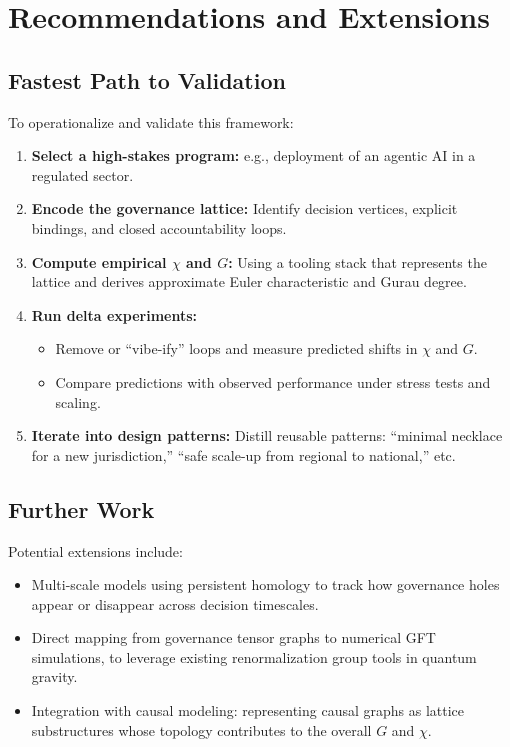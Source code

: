 \documentclass[11pt]{article}
\begin{document}
\section{Recommendations and Extensions}

\subsection{Fastest Path to Validation}

To operationalize and validate this framework:

\begin{enumerate}
  \item \textbf{Select a high-stakes program:} e.g., deployment of an agentic AI in a regulated sector.
  \item \textbf{Encode the governance lattice:} Identify decision vertices, explicit bindings, and closed accountability loops.
  \item \textbf{Compute empirical \(\chi\) and \(G\):} Using a tooling stack that represents the lattice and derives approximate Euler characteristic and Gurau degree.
  \item \textbf{Run delta experiments:} 
  \begin{itemize}
    \item Remove or ``vibe-ify'' loops and measure predicted shifts in \(\chi\) and \(G\).
    \item Compare predictions with observed performance under stress tests and scaling.
  \end{itemize}
  \item \textbf{Iterate into design patterns:} Distill reusable patterns: ``minimal necklace for a new jurisdiction,'' ``safe scale-up from regional to national,'' etc.
\end{enumerate}

\subsection{Further Work}

Potential extensions include:
\begin{itemize}
  \item Multi-scale models using persistent homology to track how governance holes appear or disappear across decision timescales.
  \item Direct mapping from governance tensor graphs to numerical GFT simulations, to leverage existing renormalization group tools in quantum gravity.
  \item Integration with causal modeling: representing causal graphs as lattice substructures whose topology contributes to the overall \(G\) and \(\chi\).
\end{itemize}
\end{document}
